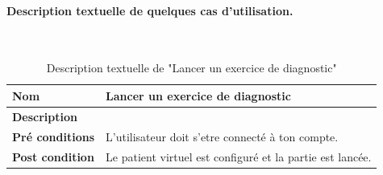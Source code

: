     \paragraph{Description textuelle de quelques cas d'utilisation.} \hfill \\
    
    \begin{table}[H]
        \centering
        \begin{tabular}{|p{}|p{}|}
            \hline
            \textbf{Nom} &  Lancer un exercice de diagnostic\\
            \hline
            \textbf{Description}& \\ 
            \hline
            \textbf{Pré conditions}& L'utilisateur doit s'etre connecté à ton compte.\\ 
            \hline
            \textbf{Post condition}& Le patient virtuel est configuré et la partie est lancée.\\ 
            \hline
        \end{tabular}
        
        \captionsetup{justification=centering}
        \caption{Description textuelle de "Lancer un exercice de diagnostic"}
        \label{tab:exercice_use_case}
    \end{table}
    
